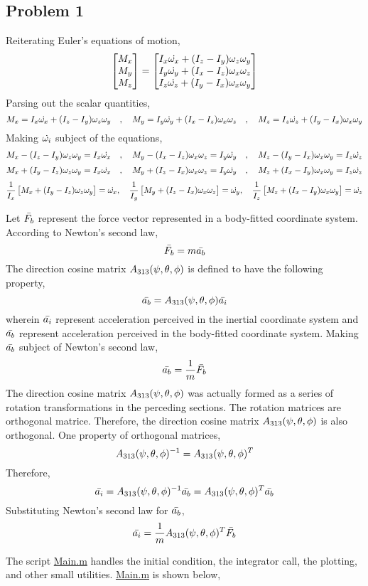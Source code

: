 \documentclass[class=report, 12pt, crop=false]{standalone}
\begin{document}
\begin{center}
\section{Problem 1}
\begin{comment}
\end{comment}
Reiterating Euler's equations of motion,
$$\begin{bmatrix}M_x \\ M_y \\ M_z\end{bmatrix} = \begin{bmatrix} 
I_{x}\dot{\omega_x} + (I_{z} - I_{y})\omega_z\omega_y\\
I_{y}\dot{\omega_y} + (I_{x} - I_{z})\omega_x\omega_z\\
I_{z}\dot{\omega_z} + (I_{y} - I_{x})\omega_x\omega_y
\end{bmatrix}$$
Parsing out the scalar quantities,
$$M_x=I_{x}\dot{\omega_x} + (I_{z} - I_{y})\omega_z\omega_y \quad,\quad M_y=I_{y}\dot{\omega_y} + (I_{x} - I_{z})\omega_x\omega_z \quad,\quad M_z=I_{z}\dot{\omega_z} + (I_{y} - I_{x})\omega_x\omega_y$$
Making $\dot{\omega_i}$ subject of the equations,
$$M_x - (I_{z} - I_{y})\omega_z\omega_y=I_{x}\dot{\omega_x} \quad,\quad M_y - (I_{x} - I_{z})\omega_x\omega_z=I_{y}\dot{\omega_y} \quad,\quad M_z - (I_{y} - I_{x})\omega_x\omega_y=I_{z}\dot{\omega_z}$$
$$M_x+(I_{y}-I_{z})\omega_z\omega_y = I_{x}\dot{\omega_x} \quad,\quad M_y+(I_{z}-I_{x})\omega_x\omega_z = I_{y}\dot{\omega_y} \quad,\quad M_z+(I_{x}-I_{y})\omega_x\omega_y = I_{z}\dot{\omega_z}$$
$$\frac{1}{I_{x}}\left[M_x+(I_{y}-I_{z})\omega_z\omega_y\right] = \dot{\omega_x} ,\quad \frac{1}{I_{y}}\left[M_y+(I_{z}-I_{x})\omega_x\omega_z\right] = \dot{\omega_y} ,\quad \frac{1}{I_{z}}\left[M_z+(I_{x}-I_{y})\omega_x\omega_y\right] = \dot{\omega_z}$$


Let $\bar{F_b}$ represent the force vector represented in a body-fitted coordinate system. According to Newton's second law,
$$\bar{F_b} = m\bar{a_b}$$
The direction cosine matrix $A_{313}(\psi,\theta,\phi)$ is defined to have the following property,
$$\bar{a_b} = A_{313}(\psi,\theta,\phi) \bar{a_i}$$
wherein $\bar{a_i}$ represent acceleration perceived in the inertial coordinate system and $\bar{a_b}$ represent acceleration perceived in the body-fitted coordinate system. Making $\bar{a_b}$ subject of Newton's second law,
$$\bar{a_b} = \frac{1}{m}\bar{F_b}$$
The direction cosine matrix $A_{313}(\psi,\theta,\phi)$ was actually formed as a series of rotation transformations in the perceding sections. The rotation matrices are orthogonal matrice. Therefore, the direction cosine matrix $A_{313}(\psi,\theta,\phi)$ is also orthogonal. One property of orthogonal matrices,
$$A_{313}(\psi,\theta,\phi)^{-1} = A_{313}(\psi,\theta,\phi)^T$$
Therefore, 
$$\bar{a_i} = A_{313}(\psi,\theta,\phi)^{-1}\bar{a_b} = A_{313}(\psi,\theta,\phi)^T\bar{a_b}$$
Substituting Newton's second law for $\bar{a_b}$,
$$\bar{a_i} = \frac{1}{m}A_{313}(\psi,\theta,\phi)^T\bar{F_b}$$

The script \url{Main.m} handles the initial condition, the integrator call, the plotting, and other small utilities. \url{Main.m} is shown below,













\end{center}
\end{document}
